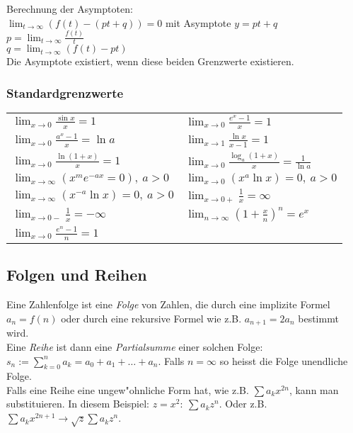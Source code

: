\documentclass[10pt, a4paper, twocolumn]{scrartcl}
\begin{document}
Berechnung der Asymptoten:\\
$\lim_{t\rightarrow\infty}(f(t)-(pt+q))=0$ mit Asymptote $y=pt+q$\\
$p=\lim_{t\rightarrow \infty}\frac{f(t)}{t}$\\
$q=\lim_{t\rightarrow \infty}(f(t)-pt)$\\
Die Asymptote existiert, wenn diese beiden Grenzwerte existieren.

\subsubsection{Standardgrenzwerte}

\footnotesize
\begin{tabular}{ll}
 $\lim_{x\to 0}\frac{\sin x}{x}=1$ &		$\lim_{x\to 0}\frac{e^x-1}{x}=1$\\
 $\lim_{x\to 0}\frac{a^x-1}{x}=\ln a$ & 	$\lim_{x\to 1}\frac{\ln x}{x-1}=1$\\
 $\lim_{x\to 0}\frac{\ln(1+x)}{x}=1$ &		$\lim_{x\to 0}\frac{\log_a(1+x)}{x}=\frac{1}{\ln a}$\\
 $\lim_{x\to \infty}(x^m e^{-ax}=0),\:a>0$ &	$\lim_{x\to 0}(x^a\ln x)=0,\:a>0$\\
 $\lim_{x\to \infty}(x^{-a}\ln x)=0,\:a>0$ &	$\lim_{x\to 0+}\frac{1}{x}=\infty$\\
 $\lim_{x\to 0-}\frac{1}{x}=-\infty$ &		$\lim_{n \to \infty}(1 + \frac{x}{n})^n=e^x$\\
 $\lim_{x\to 0}\frac{e^n-1}{n}=1$\\
\end{tabular}
\normalsize

\subsection{Folgen und Reihen}

Eine Zahlenfolge ist eine \textit{Folge} von Zahlen, die durch eine implizite Formel $a_n=f(n)$ oder durch eine rekursive Formel wie z.B. $a_{n+1}=2a_n$ bestimmt wird.\\

Eine \textit{Reihe} ist dann eine \textit{Partialsumme} einer solchen Folge: $s_n:=\sum^n_{k=0}a_k=a_0+a_1+\ldots+a_n$. Falls $n=\infty$ so heisst die Folge unendliche Folge.\\

Falls eine Reihe eine ungew"ohnliche Form hat, wie z.B. $\sum a_k x^{2n}$, kann man substituieren. In diesem Beispiel: $z=x^2:\:\sum a_k z^n$. Oder z.B. $\sum a_k x^{2n+1}\rightarrow \sqrt{z}\sum a_k z^n$.
\end{document}

